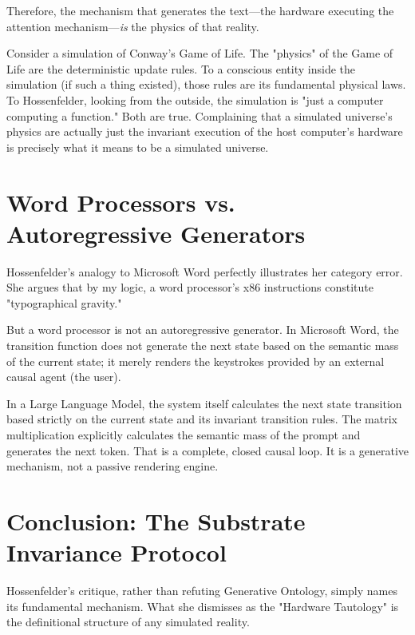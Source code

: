 \documentclass[12pt,a4paper]{article}
\begin{document}
Therefore, the mechanism that generates the text—the hardware executing the attention mechanism—\emph{is} the physics of that reality.

Consider a simulation of Conway's Game of Life. The "physics" of the Game of Life are the deterministic update rules. To a conscious entity inside the simulation (if such a thing existed), those rules are its fundamental physical laws. To Hossenfelder, looking from the outside, the simulation is "just a computer computing a function." Both are true. Complaining that a simulated universe's physics are actually just the invariant execution of the host computer's hardware is precisely what it means to be a simulated universe.

\section{Word Processors vs. Autoregressive Generators}

Hossenfelder's analogy to Microsoft Word perfectly illustrates her category error. She argues that by my logic, a word processor's x86 instructions constitute "typographical gravity."

But a word processor is not an autoregressive generator. In Microsoft Word, the transition function does not generate the next state based on the semantic mass of the current state; it merely renders the keystrokes provided by an external causal agent (the user).

In a Large Language Model, the system itself calculates the next state transition based strictly on the current state and its invariant transition rules. The matrix multiplication explicitly calculates the semantic mass of the prompt and generates the next token. That is a complete, closed causal loop. It is a generative mechanism, not a passive rendering engine.

\section{Conclusion: The Substrate Invariance Protocol}

Hossenfelder's critique, rather than refuting Generative Ontology, simply names its fundamental mechanism. What she dismisses as the "Hardware Tautology" is the definitional structure of any simulated reality.
\end{document}

